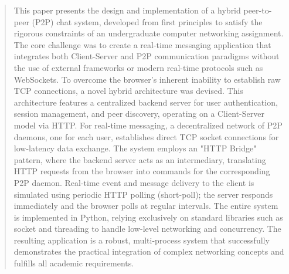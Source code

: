 \begin{abstract}
This paper presents the design and implementation of a hybrid peer-to-peer (P2P) chat system, developed from first principles to satisfy the rigorous constraints of an undergraduate computer networking assignment. The core challenge was to create a real-time messaging application that integrates both Client-Server and P2P communication paradigms without the use of external frameworks or modern real-time protocols such as WebSockets. To overcome the browser's inherent inability to establish raw TCP connections, a novel hybrid architecture was devised. This architecture features a centralized backend server for user authentication, session management, and peer discovery, operating on a Client-Server model via HTTP. For real-time messaging, a decentralized network of P2P daemons, one for each user, establishes direct TCP socket connections for low-latency data exchange. The system employs an "HTTP Bridge" pattern, where the backend server acts as an intermediary, translating HTTP requests from the browser into commands for the corresponding P2P daemon. Real-time event and message delivery to the client is simulated using periodic HTTP polling (short-poll); the server responds immediately and the browser polls at regular intervals. The entire system is implemented in Python, relying exclusively on standard libraries such as socket and threading to handle low-level networking and concurrency. The resulting application is a robust, multi-process system that successfully demonstrates the practical integration of complex networking concepts and fulfills all academic requirements.
\end{abstract}